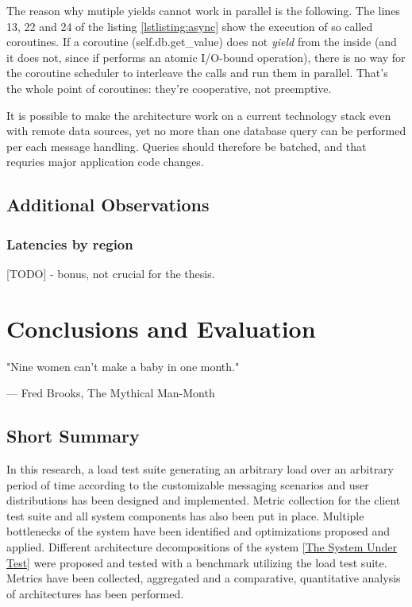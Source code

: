 \documentclass{uvamscse}
\begin{document}
The reason why mutiple yields cannot work in parallel is the following. The lines 13, 22 and 24 of the listing \ref{lstlisting:async} show the execution of so called coroutines. If a coroutine (self.db.get\_value) does not \textit{yield} from the inside (and it does not, since if performs an atomic I/O-bound operation), there is no way for the coroutine scheduler to interleave the calls and run them in parallel. That's the whole point of coroutines: they're cooperative, not preemptive.

It is possible to make the architecture work on a current technology stack even with remote data sources, yet no more than one database query can be performed per each message handling. Queries should therefore be batched, and that requries major application code changes.

\section{Additional Observations}

\subsection{Latencies by region}
[TODO] - bonus, not crucial for the thesis. 



\chapter{Conclusions and Evaluation}\label{Conclusions and Evaluation}
\epigraph{"Nine women can't make a baby in one month."}{--- Fred Brooks, The Mythical Man-Month}

\section{Short Summary}
In this research, a load test suite generating an arbitrary load over an arbitrary period of time according to the customizable messaging scenarios and user distributions has been designed and implemented. Metric collection for the client test suite and all system components has also been put in place. Multiple bottlenecks of the system have been identified and optimizations proposed and applied. Different architecture decompositions of the system \ref{The System Under Test} were proposed and tested with a benchmark utilizing the load test suite. Metrics have been collected, aggregated and a comparative, quantitative analysis of architectures has been performed.
\end{document}
